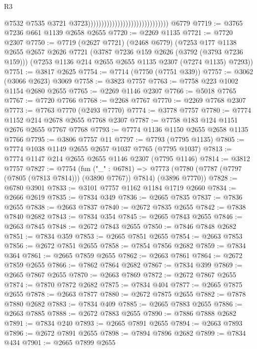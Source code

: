 \begin{lexlean}{R3}
\begin{coremodule}
                                                                @7532
                                                                @7535
                                                                @3721
                                                                @3723))))))))))))))))))))))))))))))
    @6779
@7719 := @3765 @7236 @661 @1139 @2658 @2655
@7720 := @2269 @1135
@7721 := @7720 @2307
@7750 := @7719
    (@2627 @7721)
    (@2468 @6779)
    (@7253
      @177
      @1138
      @2655
      @2657
      @2626
      @7721
      (@3787 @7236 @159 @2626 (@3792 (@3793 @7236 @159)))
      (@7253 @1136 @214 @2655 @2655 @1135 @2307 (@7274 @1135) @7293))
@7751 := @3817 @2625
@7754 := @7714 (@7750 (@7751 @339))
@7757 := @3062 (@3066 @2623) @3069
@7758 := @3823 @7757
@7763 := @7758 @223 @1002 @1154 @2680 @2655
@7765 := @2269 @1146 @2307
@7766 := @5018 @7765
@7767 := @7720 @7766
@7768 := @2268 @7767
@7770 := @2269 @7768 @2307
@7773 := @7763 @7770 (@2493 @7770)
@7774 := @3778 @7757
@7780 := @7774 @1152 @214 @2678 @2655 @7768 @2307
@7787 := @7758 @183 @124 @1151 @2676 @2655 @7767 @7768
@7793 := @7774 @1136 @1150 @2655 @2658 @1135 @7766
@7795 := @3806 @7757 @11
@7797 := @7793 (@7795 @1135)
@7805 := @7774 @1038 @1149 @2655 @2657 @1037 @7765 (@7795 @1037)
@7813 := @7774 @1147 @214 @2655 @2655 @1146 @2307 (@7795 @1146)
@7814 := @3812 @7757
@7827 := @7754
    (fun ("_" : @6781) =>
    @7773 (@7780 (@7787 (@7797 (@7805 (@7813 @7814))) (@3890 @7767)) @7814) (@3896 @7770))
@7828 := @6780 @3901
@7833 := @3101 @7757 @1162 @1184 @1719 @2660
@7834 := @2666 @2619
@7835 := @7834 @349
@7836 := @2665 @7835
@7837 := @7836 @2655
@7838 := @2663 @7837
@7840 := @2672 @7835 @2655
@7842 := @7838 @7840 @2682
@7843 := @7834 @354
@7845 := @2665 @7843 @2655
@7846 := @2663 @7845
@7848 := @2672 @7843 @2655
@7850 := @7846 @7848 @2682
@7851 := @7834 @359
@7853 := @2665 @7851 @2655
@7854 := @2663 @7853
@7856 := @2672 @7851 @2655
@7858 := @7854 @7856 @2682
@7859 := @7834 @364
@7861 := @2665 @7859 @2655
@7862 := @2663 @7861
@7864 := @2672 @7859 @2655
@7866 := @7862 @7864 @2682
@7867 := @7834 @399
@7869 := @2665 @7867 @2655
@7870 := @2663 @7869
@7872 := @2672 @7867 @2655
@7874 := @7870 @7872 @2682
@7875 := @7834 @404
@7877 := @2665 @7875 @2655
@7878 := @2663 @7877
@7880 := @2672 @7875 @2655
@7882 := @7878 @7880 @2682
@7883 := @7834 @409
@7885 := @2665 @7883 @2655
@7886 := @2663 @7885
@7888 := @2672 @7883 @2655
@7890 := @7886 @7888 @2682
@7891 := @7834 @240
@7893 := @2665 @7891 @2655
@7894 := @2663 @7893
@7896 := @2672 @7891 @2655
@7898 := @7894 @7896 @2682
@7899 := @7834 @434
@7901 := @2665 @7899 @2655

\end{coremodule}
\end{lexlean}
